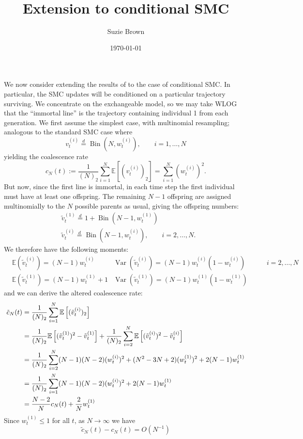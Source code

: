 \documentclass{article}
\title{Extension to conditional SMC}
\author{Suzie Brown}
\date{\today}
\newcommand{\E}{\mathbb{E}}
\newcommand{\V}{\operatorname{Var}}
\newcommand{\vt}[2][t]{v_{#1}^{(#2)}}
\newcommand{\vttilde}[2][t]{\tilde{v}_{#1}^{(#2)}}
\newcommand{\wt}[2][t]{w_{#1}^{(#2)}}
\newcommand{\eqdist}{\overset{d}{=}}
\newcommand{\Bin}{\operatorname{Bin}}
\begin{document}
\maketitle
We now consider extending the results of \citet{koskela2018} to the case of conditional SMC.
In particular, the SMC updates will be conditioned on a particular trajectory surviving. We concentrate on the exchangeable model, so we may take WLOG that the ``immortal line'' is the trajectory containing individual 1 from each generation.
We first assume the simplest case, with multinomial resampling; analogous to the standard SMC case where
\begin{equation*}
\vt{i} \eqdist \Bin (N, \wt{i}), \qquad i=1,\dots,N
\end{equation*}
yielding the coalescence rate
\begin{equation}
c_N(t) := \frac{1}{(N)_2} \sum_{i=1}^{N} \E\left[ (\vt{i})_2 \right] = \sum_{i=1}^{N} (\wt{i})^2.
\end{equation}
But now, since the first line is immortal, in each time step the first individual must have at least one offspring. The remaining $N-1$ offspring are assigned multinomially to the $N$ possible parents as usual, giving the offspring numbers:
\begin{align*}
& \vttilde{1} \eqdist 1 + \Bin(N-1, \wt{1}) \\
& \vttilde{i} \eqdist \Bin(N-1, \wt{i}), \qquad i=2,\dots,N.
\end{align*}
We therefore have the following moments:
\begin{align*}
&\E(\vttilde{i}) = (N-1)\wt{i} & \V(\vttilde{i}) = (N-1)\wt{i}(1-\wt{i}) &\qquad i=2,\dots,N \\
&\E(\vttilde{1}) = (N-1)\wt{1} + 1 & \V(\vttilde{1}) = (N-1)\wt{1}(1-\wt{1}) &
\end{align*}
and we can derive the altered coalescence rate:
\begin{align}
\tilde{c}_N(t) &= \frac{1}{(N)_2} \sum_{i=1}^{N} \E\left[ (\vttilde{i})_2 \right] \notag\\
&= \frac{1}{(N)_2} \E\left[ (\vttilde{1})^2 - \vttilde{1} \right] + \frac{1}{(N)_2}\sum_{i=2}^{N} \E\left[ (\vttilde{i})^2 - \vttilde{i} \right] \notag\\
&= \frac{1}{(N)_2} \sum_{i=2}^{N} (N-1)(N-2)(\wt{i})^2 + (N^2-3N+2)(\wt{1})^2 + 2(N-1)\wt{1} \notag\\
&= \frac{1}{(N)_2} \sum_{i=1}^{N} (N-1)(N-2)(\wt{i})^2 + 2(N-1)\wt{1} \notag\\
&= \frac{N-2}{N} c_N(t) + \frac{2}{N} \wt{1}
\end{align}
Since $\wt{1} \leq 1$ for all $t$, as $N\to\infty$ we have
\begin{equation*}
\tilde{c}_N(t) - c_N(t) = O(N^{-1})
\end{equation*}


\end{document}
